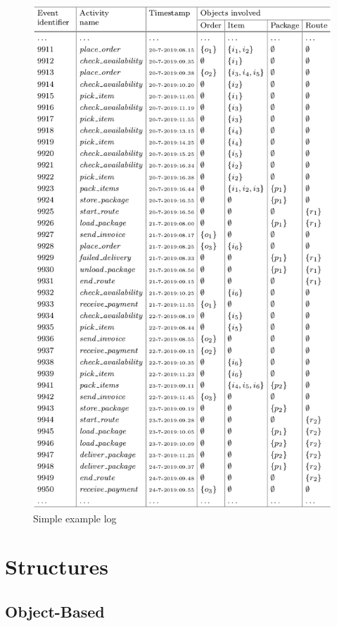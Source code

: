 \documentclass{article}
\begin{document}
\begin{figure}[h]
	\centering
	\includegraphics[scale=0.2496]{images/ocel.png}
	\caption{Simple example log}
	\label{fig:log}
\end{figure}

\section{Structures}
\subsection{Object-Based}
\end{document}
